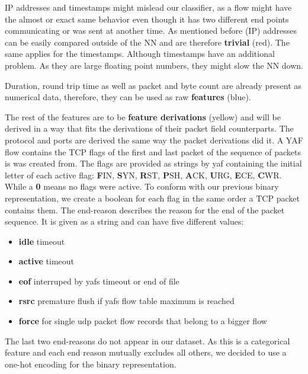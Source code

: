\documentclass[
	ngerman,
	ruledheaders=section,%
	class=report,%
	thesis={type=bachelor},%
	accentcolor=9c,%
	custommargins=true,%
	marginpar=false,%
	parskip=half-,%
	fontsize=11pt,%
]{tudapub}
\begin{document}
IP addresses and timestamps might mislead our classifier, as a flow might have the almost or exact same behavior even though it has two different end points communicating or was sent at another time.
As mentioned before (IP) addresses can be easily compared outside of the NN and are therefore \colorbox{trivial}{\textbf{trivial} (red)}.
The same applies for the timestamps.
Although timestamps have an additional problem. As they are large floating point numbers, they might slow the NN down.

Duration, round trip time as well as packet and byte count are already present as numerical data, therefore, they can be used as raw \colorbox{feature}{\textbf{features} (blue)}.


The rest of the features are to be \colorbox{derivation}{\textbf{feature derivations} (yellow)} and will be derived in a way that fits the derivations of their packet field counterparts.
The protocol and ports are derived the same way the packet derivations did it.
A YAF flow contains the TCP flags of the first and last packet of the sequence of packets is was created from.
The flags are provided as strings by yaf containing the initial letter of each active flag:
\textbf{F}IN, \textbf{S}YN, \textbf{R}ST, \textbf{P}SH, \textbf{A}CK, \textbf{U}RG, \textbf{E}CE, \textbf{C}WR.
While a \textbf{0} means no flags were active.
To conform with our previous binary representation, we create a boolean for each flag in the same order a TCP packet contains them.
The end-reason describes the reason for the end of the packet sequence.
It is given as a string and can have five different values:
\begin{itemize}
    \item \textbf{idle} timeout
    \item \textbf{active} timeout
    \item \textbf{eof} interruped by yafs timeout or end of file
    \item \textbf{rsrc} premature flush if yafs flow table maximum is reached
    \item \textbf{force} for single udp packet flow records that belong to a bigger flow
\end{itemize}
The last two end-reasons do not appear in our dataset.
As this is a categorical feature and each end reason mutually excludes all others, we decided to use a one-hot encoding for the binary representation.
\end{document}
